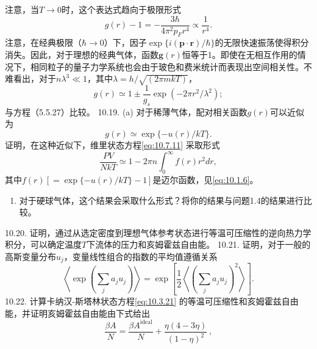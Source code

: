注意，当\(T \rightarrow 0\)时，这个表达式趋向于极限形式
\begin{equation}\tag{10.7.48}\label{eq:10.7.48}
g ( r ) - 1 = - \frac { 3 \hbar } { 4 \pi ^{2} p _ { F } r ^{4} } \propto \frac { 1 } { r ^{4} } .
\end{equation}
注意，在经典极限（\(\hbar \to 0\)）下，因子\(\exp\{i(\boldsymbol{p} \cdot \boldsymbol{r})/\hbar\}\)的无限快速振荡使得积分消失。因此，对于理想的经典气体，函数\(\mathbf{g}(r)\)恒等于1。即使在无相互作用的情况下，相同粒子的量子力学系统也会由于玻色和费米统计而表现出空间相关性。不难看出，对于\(n\lambda^3 \ll 1\)，其中\(\lambda = h/\sqrt{(2\pi mkT)}\)，
\begin{equation}\tag{10.7.49}\label{eq:10.7.49}
g ( r ) \simeq 1 \pm \frac { 1 } { g _ { s } } \exp ( - 2 \pi r ^{2} / \lambda ^{2} ) ;
\end{equation}
与方程（5.5.27）比较。
10.19. (a) 对于稀薄气体，配对相关函数\(g(r)\)可以近似为
\begin{equation}\tag{10.7.50}\label{eq:10.7.50}
g ( r ) \simeq \exp \{ - u ( r ) / k T \} .
\end{equation}
证明，在这种近似下，维里状态方程\autoref{eq:10.7.11} 采取形式
\begin{equation}\tag{10.7.51}\label{eq:10.7.51}
\frac { P V } { N k T } \simeq 1 - 2 \pi n \int _ { 0 } ^{\infty} f ( r ) r ^{2} d r ,
\end{equation}
其中\(f(r) \left[=\exp \{-u(r)/kT\}-1\right]\)是迈尔函数，见\autoref{eq:10.1.6}。
\begin{enumerate}
\def\labelenumi{(\alph{enumi})}
\setcounter{enumi}{1}
\item
  对于硬球气体，这个结果会采取什么形式？将你的结果与问题1.4的结果进行比较。
\end{enumerate}
10.20. 证明，通过从选定密度到理想气体参考状态进行等温可压缩性的逆向热力学积分，可以确定温度\(T\)下流体的压力和亥姆霍兹自由能。
10.21. 证明，对于一般的高斯变量分布\(u_j\)，变量线性组合的指数的平均值遵循关系
\begin{equation}\tag{10.7.52}\label{eq:10.7.52}
\left\langle \exp \left( \sum _ { j } a _ { j } u _ { j } \right) \right\rangle = \exp \left[ \frac { 1 } { 2 } \left\langle \left( \sum _ { j } a _ { j } u _ { j } \right) ^{2} \right\rangle \right] .
\end{equation}
10.22. 计算卡纳汉-斯塔林状态方程\autoref{eq:10.3.21} 的等温可压缩性和亥姆霍兹自由能，并证明亥姆霍兹自由能由下式给出
\begin{equation}\tag{10.7.53}\label{eq:10.7.53}
\frac { \beta A } { N } = \frac { \beta A ^{\mathrm { i d e a l} } } { N } + \frac { \eta ( 4 - 3 \eta ) } { ( 1 - \eta ) ^{2} } \, ,
\end{equation}
